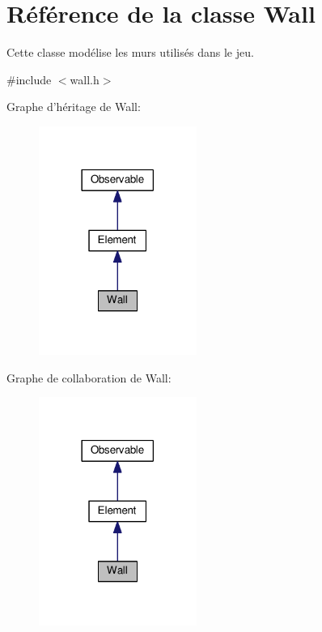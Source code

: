 \hypertarget{classWall}{\section{Référence de la classe Wall}
\label{classWall}
}


Cette classe modélise les murs utilisés dans le jeu.  




{\ttfamily \#include $<$wall.\+h$>$}



Graphe d'héritage de Wall\+:\nopagebreak
\begin{figure}[H]
\begin{center}
\leavevmode
\includegraphics[width=146pt]{de/d28/classWall__inherit__graph}
\end{center}
\end{figure}


Graphe de collaboration de Wall\+:\nopagebreak
\begin{figure}[H]
\begin{center}
\leavevmode
\includegraphics[width=146pt]{d9/d82/classWall__coll__graph}
\end{center}
\end{figure}
